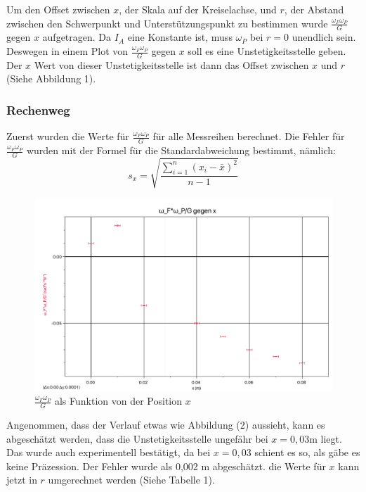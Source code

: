\documentclass[11pt,a4paper]{article} %
\begin{document}
Um den Offset zwischen $x$, der Skala auf der Kreiselachse, und $r$, der Abstand zwischen den Schwerpunkt und Unterstützungspunkt zu bestimmen wurde $\frac{\omega_F\omega_P}{G}$ gegen $x$ aufgetragen. Da $I_A$ eine Konstante ist, muss $\omega_P$ bei $r = 0$ unendlich sein. Deswegen in einem Plot von $\frac{\omega_F\omega_P}{G}$ gegen $x$ soll es eine Unstetigkeitsstelle geben. Der $x$ Wert von dieser Unstetigkeitsstelle ist dann das Offset zwischen $x$ und $r$ (Siehe Abbildung 1).
\begin{tcolorbox}[colback=white] 
\subsubsection{Rechenweg}
Zuerst wurden die Werte für $\frac{\omega_F\omega_P}{G}$ für alle Messreihen berechnet. Die Fehler für $\frac{\omega_F\omega_P}{G}$ wurden mit der Formel für die Standardabweichung bestimmt, nämlich:
$$s_x = \sqrt{\frac{\sum_{i=1}^{n}(x_i-\bar{x})^2}{n-1}} $$
\end{tcolorbox}

\begin{figure}
	\centering
	\includegraphics[width=\linewidth]{Abb1}
	\caption{$\frac{\omega_F\omega_P}{G}$ als Funktion von der Position $x$}
\end{figure}

Angenommen, dass der Verlauf etwas wie Abbildung (2) aussieht, kann es abgeschätzt werden, dass die Unstetigkeitsstelle ungefähr bei $x=0,03$m liegt. Das wurde auch experimentell bestätigt, da bei $x=0,03$ schient es so, als gäbe es keine Präzession. Der Fehler wurde als 0,002 m abgeschätzt. die Werte für $x$ kann jetzt in $r$ umgerechnet werden (Siehe Tabelle 1). 
\end{document}
